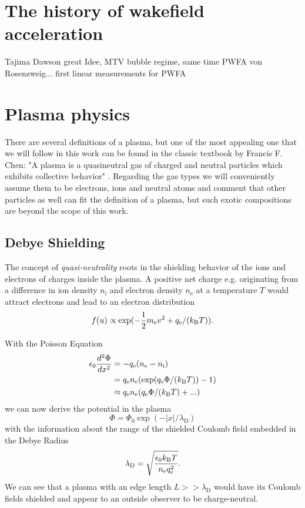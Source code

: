 
\section{The history of wakefield acceleration}
Tajima Dawson great Idee, MTV bubble regime, same time PWFA von Rosenzweig... first linear measurements for PWFA
\section{Plasma physics}
There are several definitions of a plasma, but one of the most appealing one that we will follow in this work can be found in the classic 
textbook by Francis F. Chen:
"A plasma is a quasineutral gas of charged and neutral particles which
exhibits collective behavior" \cite{Chen_book_Plasma}.
Regarding the gas types we will conveniently assume them to be electrons, ions and neutral atoms and comment that other particles as well can fit the definition of a plasma, but such exotic compositions are beyond the scope of this work.
\subsection*{Debye Shielding}
The concept of \textit{quasi-neutrality} roots in the shielding behavior of the ions and electrons of charges inside the plasma. 
A positive net charge e.g. originating from a difference in ion density $n_\mathrm{i}$ and electron density $n_\mathrm{e}$ at a temperature $T$
would attract electrons and lead to an electron distribution 
\begin{equation}
f(u) \propto \exp(-\frac{1}{2}m_\mathrm{e} v^2+q_\mathrm{e}/( k_\mathrm{B}T)).
\end{equation}

With the Poisson Equation 
\begin{align}
\label{eqn:Poisson_plasma}
\epsilon_0 \frac{d^2\Phi}{dx^2}&=-q_\mathrm{e}(n_\mathrm{e}-n_\mathrm{i})\\
&=q_\mathrm{e} n_\mathrm{e} (\exp(q_\mathrm{e}\Phi/(k_\mathrm{B}T))-1)\\
&\approx q_\mathrm{e}n_\mathrm{e}(q_\mathrm{e}\Phi/(k_\mathrm{B}T)+...)
\end{align}
we can now derive the potential in the plasma
\begin{equation}
\Phi = \Phi_0\exp(-|x|/\lambda_\mathrm{D})
\end{equation}
with the information about the range of the shielded Coulomb field embedded in the Debye Radius
\begin{equation}
\lambda_\mathrm{D}=\sqrt{\frac{\epsilon_0 k_\mathrm{B}T}{n_\mathrm{e}q_\mathrm{e}^2}}.
\end{equation}
We can see that a plasma with an edge length $L>>\lambda_\mathrm{D}$ would have its Coulomb fields shielded and appear to an outside observer to be charge-neutral. 



